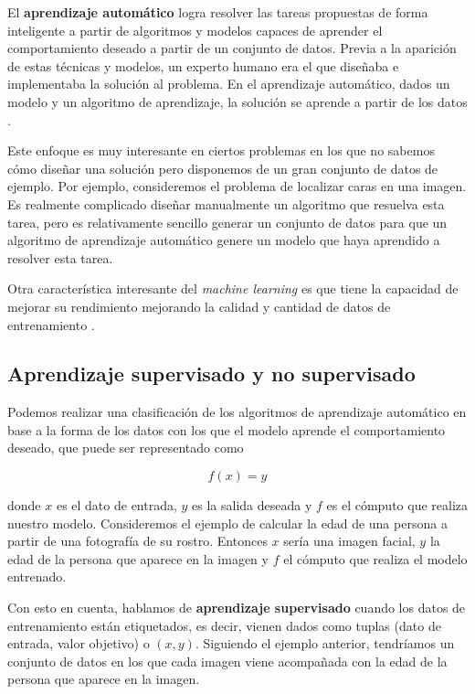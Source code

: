 El \textbf{aprendizaje automático} logra resolver las tareas propuestas de forma inteligente a partir de algoritmos y modelos capaces de aprender el comportamiento deseado a partir de un conjunto de datos. Previa a la aparición de estas técnicas y modelos, un experto humano era el que diseñaba e implementaba la solución al problema. En el aprendizaje automático, dados un modelo y un algoritmo de aprendizaje, la solución se aprende a partir de los datos \cite{informatica:libro_europa_IA}.

Este enfoque es muy interesante en ciertos problemas en los que no sabemos cómo diseñar una solución pero disponemos de un gran conjunto de datos de ejemplo. Por ejemplo, consideremos el problema de localizar caras en una imagen. Es realmente complicado diseñar manualmente un algoritmo que resuelva esta tarea, pero es relativamente sencillo generar un conjunto de datos para que un algoritmo de aprendizaje automático genere un modelo que haya aprendido a resolver esta tarea.

Otra característica interesante del \textit{machine learning} es que tiene la capacidad de mejorar su rendimiento mejorando la calidad y cantidad de datos de entrenamiento \cite{informatica:paper_que_es_ml}.

\subsection{Aprendizaje supervisado y no supervisado}

Podemos realizar una clasificación de los algoritmos de aprendizaje automático en base a la forma de los datos con los que el modelo aprende el comportamiento deseado, que puede ser representado como

\begin{equation}
    f(x) = y
\end{equation}

donde $x$ es el dato de entrada, $y$ es la salida deseada y $f$ es el cómputo que realiza nuestro modelo. Consideremos el ejemplo de calcular la edad de una persona a partir de una fotografía de su rostro. Entonces $x$ sería una imagen facial, $y$ la edad de la persona que aparece en la imagen y $f$ el cómputo que realiza el modelo entrenado.

Con esto en cuenta, hablamos de \textbf{aprendizaje supervisado} cuando los datos de entrenamiento están etiquetados, es decir, vienen dados como tuplas (dato de entrada, valor objetivo) o $(x, y)$. Siguiendo el ejemplo anterior, tendríamos un conjunto de datos en los que cada imagen viene acompañada con la edad de la persona que aparece en la imagen.

